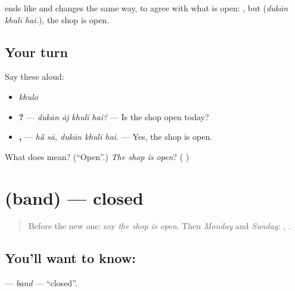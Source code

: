 \begin{grammarlens}[title={What you've built}]
\textbf{} ends like \textbf{} and changes the same way, to agree with what is open: \textbf{  }, but \textbf{  } (\emph{dukān khulī hai.}), the shop is open.
\end{grammarlens}

\subsection*{Your turn}
Say these aloud:

\begin{itemize}
\raggedright
  \item \emph{khulo}
  \item \textbf{   ?} — \emph{dukān āj khulī hai?} — Is the shop open today?
  \item \textbf{ ,   } — \emph{hā̃ sā, dukān khulī hai.} — Yes, the shop is open.
\end{itemize}

\begin{tcolorbox}[breakable,colback=teal!4,colframe=teal!35!black,title={Before you move on}]
What does \textbf{} mean? (\textquotedblleft{}Open\textquotedblright{}.) \emph{The shop is open}? (\textbf{  })
\end{tcolorbox}
\section[\texorpdfstring{\mw{बंद} (band)}{बंद (band)}]{ (band) — closed}

\label{lesson:MW-C164-band}



\begin{quote}
Before the new one: say \emph{the shop is open}. Then \emph{Monday} and \emph{Sunday}: \textbf{}, \textbf{}.
\end{quote}

\subsection*{You'll want to know: }
\textbf{} — \emph{band} — \textquotedblleft{}closed\textquotedblright{}.

\begin{quote}
\textbf{   }
\end{quote}

